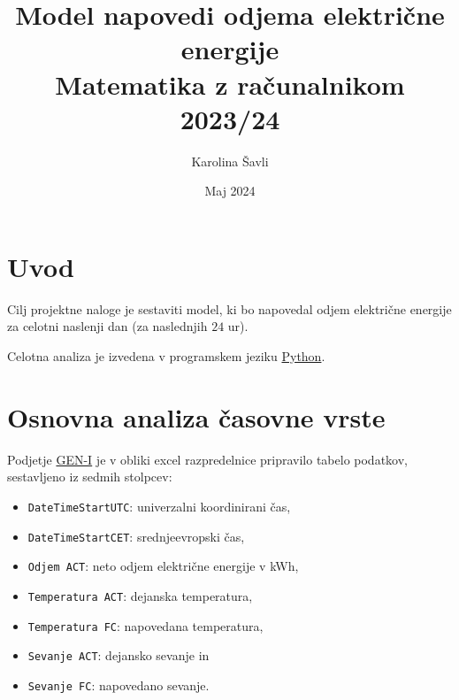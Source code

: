 \documentclass[a4paper, 11pt]{article}
\begin{document}
\title{\textbf{\LARGE{Model napovedi odjema električne energije}} \\ Matematika z računalnikom 2023/24}
\author{Karolina Šavli}
\date{Maj 2024}

\maketitle



\section{Uvod}

Cilj projektne naloge je sestaviti model, ki bo napovedal odjem električne energije 
za celotni naslenji dan (za naslednjih $24$ ur). 

Celotna analiza je izvedena v programskem jeziku \href{https://www.python.org/}{Python}.





\section{Osnovna analiza časovne vrste}

\noindent Podjetje \href{https://gen-i.si/}{GEN-I} je v obliki excel razpredelnice pripravilo tabelo podatkov, sestavljeno iz sedmih stolpcev:
\begin{itemize}
    \item  \texttt{DateTimeStartUTC}: univerzalni koordinirani čas,
    \item  \texttt{DateTimeStartCET}: srednjeevropski čas,
    \item  \texttt{Odjem ACT}: neto odjem električne energije v kWh,
    \item  \texttt{Temperatura ACT}: dejanska temperatura, 
    \item  \texttt{Temperatura FC}: napovedana temperatura,
    \item  \texttt{Sevanje ACT}: dejansko sevanje in
    \item  \texttt{Sevanje FC}: napovedano sevanje. 
\end{itemize}
\end{document}
